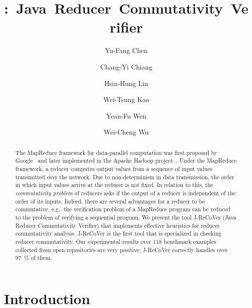 \documentclass{llncs}
\title{\hspace{-0.1cm}{J-ReCoVer}:~Java~Reducer~Commutativity~Verifier}
\author{}
\institute{}
\author{
Yu-Fang Chen\inst{1}\inst{2}
\and
Chang-Yi Chiang\inst{2}
\and
Hsin-Hung Lin\inst{1}
\and
Wei-Tsung Kao\inst{1}
\and
Yean-Fu Wen\inst{2}
\and
Wei-Cheng Wu\inst{1}
}
\institute
{
Institute of Information Science, Academia Sinica, Taiwan
\and
Graduate Institute of Information Management, National Taipei University, Taiwan
}}
\author{}
\institute{}
\begin{document}

\maketitle

\begin{abstract}

The MapReduce framework for data-parallel computation was first proposed by
Google~\cite{dean04} and later implemented in the Apache Hadoop
project~\cite{hadoop}. Under the MapReduce framework, a reducer computes output
values from a sequence of input values transmitted over the network. Due to
non-determinism in data transmission, the order in which input values arrive at
the reducer is not fixed. In relation to this, the \emph{commutativity problem}
of reducers asks if the output of a reducer is independent of the order of its
inputs. Indeed, there are several advantages for a reducer to be commutative,
e.g., the verification problem of a MapReduce program can be reduced to the
problem of verifying a sequential program. We present the tool J-ReCoVer (Java
Reducer Commutativity Verifier) that implements effective heuristics for reducer
commutativity analysis. J-ReCoVer is the first tool that is specialized in
checking reducer commutativity. Our experimental results over 118 benchmark
examples collected from open repositories are very positive; J-ReCoVer correctly
handles over 97~\% of them.

\end{abstract}

\section{Introduction} \label{section:introduction}
\end{document}
